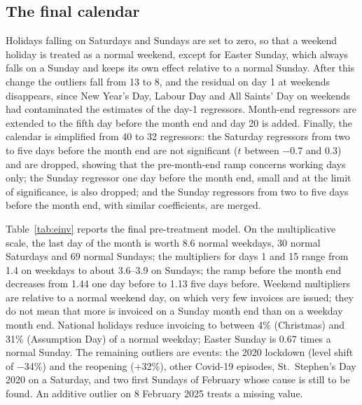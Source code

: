 \documentclass[Afour, times]{sagej}
\newcommand{\m}{$-$}
\begin{document}
\subsection{The final calendar}

Holidays falling on Saturdays and Sundays are set to zero, so that a weekend holiday is treated as a normal weekend, except for Easter Sunday, which always falls on a Sunday and keeps its own effect relative to a normal Sunday. After this change the outliers fall from 13 to 8, and the residual on day 1 at weekends disappears, since New Year's Day, Labour Day and All Saints' Day on weekends had contaminated the estimates of the day-1 regressors. Month-end regressors are extended to the fifth day before the month end and day 20 is added. Finally, the calendar is simplified from 40 to 32 regressors: the Saturday regressors from two to five days before the month end are not significant ($t$ between \m0.7 and 0.3) and are dropped, showing that the pre-month-end ramp concerns working days only; the Sunday regressor one day before the month end, small and at the limit of significance, is also dropped; and the Sunday regressors from two to five days before the month end, with similar coefficients, are merged.

Table~\ref{tab:einv} reports the final pre-treatment model. On the multiplicative scale, the last day of the month is worth 8.6 normal weekdays, 30 normal Saturdays and 69 normal Sundays; the multipliers for days 1 and 15 range from 1.4 on weekdays to about 3.6--3.9 on Sundays; the ramp before the month end decreases from 1.44 one day before to 1.13 five days before. Weekend multipliers are relative to a normal weekend day, on which very few invoices are issued; they do not mean that more is invoiced on a Sunday month end than on a weekday month end. National holidays reduce invoicing to between 4\% (Christmas) and 31\% (Assumption Day) of a normal weekday; Easter Sunday is 0.67 times a normal Sunday. The remaining outliers are events: the 2020 lockdown (level shift of \m34\%) and the reopening (+32\%), other Covid-19 episodes, St.~Stephen's Day 2020 on a Saturday, and two first Sundays of February whose cause is still to be found. An additive outlier on 8 February 2025 treats a missing value.
\end{document}
